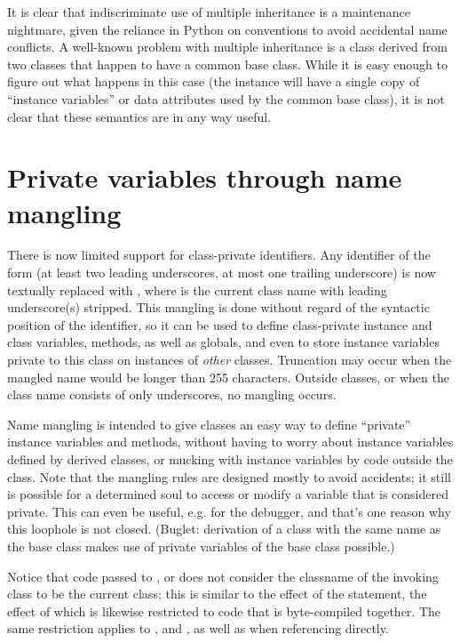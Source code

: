 It is clear that indiscriminate use of multiple inheritance is a
maintenance nightmare, given the reliance in Python on conventions to
avoid accidental name conflicts.  A well-known problem with multiple
inheritance is a class derived from two classes that happen to have a
common base class.  While it is easy enough to figure out what happens
in this case (the instance will have a single copy of ``instance
variables'' or data attributes used by the common base class), it is
not clear that these semantics are in any way useful.


\section{Private variables through name mangling}

There is now limited support for class-private
identifiers.  Any identifier of the form  (at least two
leading underscores, at most one trailing underscore) is now textually
replaced with , where  is the
current class name with leading underscore(s) stripped.  This mangling
is done without regard of the syntactic position of the identifier, so
it can be used to define class-private instance and class variables,
methods, as well as globals, and even to store instance variables
private to this class on instances of \emph{other} classes.  Truncation
may occur when the mangled name would be longer than 255 characters.
Outside classes, or when the class name consists of only underscores,
no mangling occurs.

Name mangling is intended to give classes an easy way to define
``private'' instance variables and methods, without having to worry
about instance variables defined by derived classes, or mucking with
instance variables by code outside the class.  Note that the mangling
rules are designed mostly to avoid accidents; it still is possible for
a determined soul to access or modify a variable that is considered
private.  This can even be useful, e.g. for the debugger, and that's
one reason why this loophole is not closed.  (Buglet: derivation of a
class with the same name as the base class makes use of private
variables of the base class possible.)

Notice that code passed to ,  or
 does not consider the classname of the invoking 
class to be the current class; this is similar to the effect of the 
 statement, the effect of which is likewise restricted to 
code that is byte-compiled together.  The same restriction applies to
,  and , as well as
when referencing  directly.


